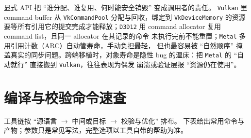 \documentclass[12pt,a4paper,fontset=fandol]{ctexbook}
\newcommand{\Tp}[1]{\texttt{#1}}
\begin{document}
显式 API 把 ``谁分配、谁复用、何时能安全销毁'' 变成调用者的责任。
\Tp{Vulkan} 里 command buffer 从 \Tp{VkCommandPool} 分配与回收，绑定到
\Tp{VkDeviceMemory} 的资源要等所有引用它的提交完成才能释放；\Tp{D3D12}
用 command allocator 复用 command list，且同一 allocator 在其记录的命令
未执行完前不能重置；\Tp{Metal} 多用引用计数（ARC）自动管寿命，手动负担最轻，
但也最容易被 ``自然顺序'' 掩盖真实的同步问题。跨端移植时，对象寿命是隐性 bug
的温床：把 \Tp{Metal} 的 ``自动就行'' 直接搬到 \Tp{Vulkan}，往往表现为偶发
崩溃或验证层报 ``资源仍在使用''。

\section{编译与校验命令速查}

工具链按 ``源语言 $\rightarrow$ 中间或目标 $\rightarrow$ 校验与优化'' 排布。
下表给出常用命令与产物；参数只是常见写法，完整选项以工具自带的帮助为准。
\end{document}
